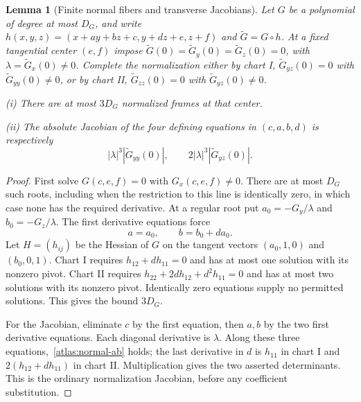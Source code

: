 \documentclass[11pt]{amsart}
\makeatletter
\newtheorem{lemma}[theorem]{Lemma}
\theoremstyle{definition}
\theoremstyle{remark}
\numberwithin{equation}{section}
\newcommand{\equationalias}[1]{\begingroup\protected@edef\@currentlabel{\p@equation\theequation}\protected@edef\@currentHref{equation.\theHequation}\label{#1}\endgroup}
\makeatother
\begin{document}
\begin{lemma}[Finite normal fibers and transverse Jacobians]\label{atlas:normal-fibers}
Let $G$ be a polynomial of degree at most $D_G$, and write $h(x,y,z)=(x+ay+bz+c,y+dz+e,z+f)$ and $\widetilde G=G\circ h$. At a fixed tangential center $(e,f)$ impose $\widetilde G(0)=\widetilde G_y(0)=\widetilde G_z(0)=0$, with $\lambda=\widetilde G_x(0)\ne0$. Complete the normalization either by chart I, $\widetilde G_{yz}(0)=0$ with $\widetilde G_{yy}(0)\ne0$, or by chart II, $\widetilde G_{zz}(0)=0$ with $\widetilde G_{yz}(0)\ne0$.

\noindent\textup{(i)} There are at most $3D_G$ normalized frames at that center.

\noindent\textup{(ii)} The absolute Jacobian of the four defining equations in $(c,a,b,d)$ is respectively
\[
 |\lambda|^3|\widetilde G_{yy}(0)|,\qquad 2|\lambda|^3|\widetilde G_{yz}(0)|.
\]
\end{lemma}
\begin{proof}
First solve $G(c,e,f)=0$ with $G_x(c,e,f)\ne0$. There are at most $D_G$ such roots, including when the restriction to this line is identically zero, in which case none has the required derivative. At a regular root put $a_0=-G_y/\lambda$ and $b_0=-G_z/\lambda$. The first derivative equations force
\begin{equation}\label{atlas:normal-ab}
a=a_0,\qquad b=b_0+da_0.
\end{equation}
\equationalias{low:4:sf:eq:ab}\equationalias{low:5:qsf:eq:ab}
Let $H=(h_{ij})$ be the Hessian of $G$ on the tangent vectors $(a_0,1,0)$ and $(b_0,0,1)$. Chart I requires $h_{12}+dh_{11}=0$ and has at most one solution with its nonzero pivot. Chart II requires $h_{22}+2dh_{12}+d^2h_{11}=0$ and has at most two solutions with its nonzero pivot. Identically zero equations supply no permitted solutions. This gives the bound $3D_G$.

For the Jacobian, eliminate $c$ by the first equation, then $a,b$ by the two first derivative equations. Each diagonal derivative is $\lambda$. Along these three equations,~\eqref{atlas:normal-ab} holds; the last derivative in $d$ is $h_{11}$ in chart I and $2(h_{12}+dh_{11})$ in chart II. Multiplication gives the two asserted determinants. This is the ordinary normalization Jacobian, before any coefficient substitution.
\end{proof}
\end{document}
